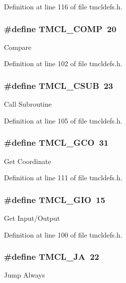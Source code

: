 Definition at line 116 of file tmcldefs.h.\hypertarget{group__TMCLComm_gab3445bd6ed45c31f3ed3f4db49914bbd}{
\subsubsection[{TMCL\_\-COMP}]{\setlength{\rightskip}{0pt plus 5cm}\#define TMCL\_\-COMP~20}}
\label{group__TMCLComm_gab3445bd6ed45c31f3ed3f4db49914bbd}
Compare 

Definition at line 102 of file tmcldefs.h.\hypertarget{group__TMCLComm_ga42c0ac92b2357e8833d3294b36f3ce03}{
\subsubsection[{TMCL\_\-CSUB}]{\setlength{\rightskip}{0pt plus 5cm}\#define TMCL\_\-CSUB~23}}
\label{group__TMCLComm_ga42c0ac92b2357e8833d3294b36f3ce03}
Call Subroutine 

Definition at line 105 of file tmcldefs.h.\hypertarget{group__TMCLComm_gadfdbd63f01a0e7148e6ad2ac5c7aa3f1}{
\subsubsection[{TMCL\_\-GCO}]{\setlength{\rightskip}{0pt plus 5cm}\#define TMCL\_\-GCO~31}}
\label{group__TMCLComm_gadfdbd63f01a0e7148e6ad2ac5c7aa3f1}
Get Coordinate 

Definition at line 111 of file tmcldefs.h.\hypertarget{group__TMCLComm_gaf8c91f7e3398565e620f87695e2ac8aa}{
\subsubsection[{TMCL\_\-GIO}]{\setlength{\rightskip}{0pt plus 5cm}\#define TMCL\_\-GIO~15}}
\label{group__TMCLComm_gaf8c91f7e3398565e620f87695e2ac8aa}
Get Input/Output 

Definition at line 100 of file tmcldefs.h.\hypertarget{group__TMCLComm_ga7516bcd7048ea0be08c282cfb65232dc}{
\subsubsection[{TMCL\_\-JA}]{\setlength{\rightskip}{0pt plus 5cm}\#define TMCL\_\-JA~22}}
\label{group__TMCLComm_ga7516bcd7048ea0be08c282cfb65232dc}
Jump Always 

